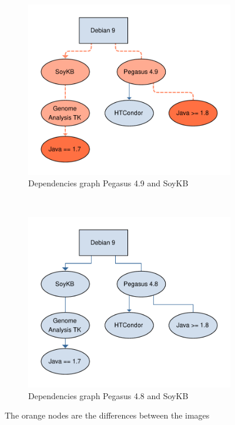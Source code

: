 \begin{figure}[]
    \centering
    \begin{subfigure}[b]{0.40\textwidth}
         \centering
         \includegraphics[width=\textwidth]{Figures/pegasus-49.pdf}
         \caption{Dependencies graph Pegasus 4.9 and SoyKB}
         \label{fig:pegasus49}
     \end{subfigure}
    ~ 
    \begin{subfigure}[b]{0.40\textwidth}
         \centering
         \includegraphics[width=\textwidth]{Figures/pegasus-48.pdf}
         \caption{Dependencies graph Pegasus 4.8 and SoyKB}
         \label{fig:pegasus48}
     \end{subfigure}
        \caption{The orange nodes are the differences between the images}
        \label{fig:dependencies-graph}
\end{figure}


